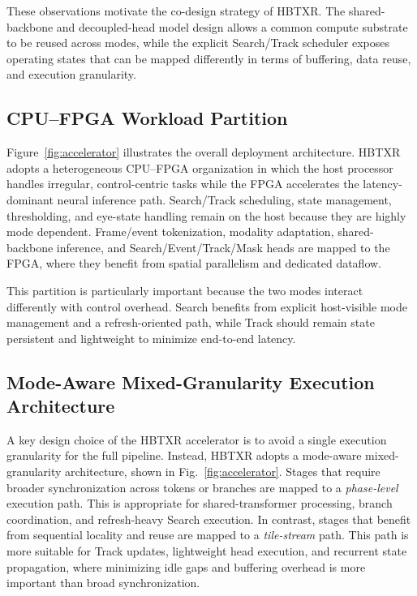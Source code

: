 \documentclass[journal]{IEEEtran}
\begin{document}
These observations motivate the co-design strategy of HBTXR. The shared-backbone and decoupled-head model design allows a common compute substrate to be reused across modes, while the explicit Search/Track scheduler exposes operating states that can be mapped differently in terms of buffering, data reuse, and execution granularity.

\subsection{CPU--FPGA Workload Partition}
Figure~\ref{fig:accelerator} illustrates the overall deployment architecture. HBTXR adopts a heterogeneous CPU--FPGA organization in which the host processor handles irregular, control-centric tasks while the FPGA accelerates the latency-dominant neural inference path. Search/Track scheduling, state management, thresholding, and eye-state handling remain on the host because they are highly mode dependent. Frame/event tokenization, modality adaptation, shared-backbone inference, and Search/Event/Track/Mask heads are mapped to the FPGA, where they benefit from spatial parallelism and dedicated dataflow.

This partition is particularly important because the two modes interact differently with control overhead. Search benefits from explicit host-visible mode management and a refresh-oriented path, while Track should remain state persistent and lightweight to minimize end-to-end latency.

\subsection{Mode-Aware Mixed-Granularity Execution Architecture}
A key design choice of the HBTXR accelerator is to avoid a single execution granularity for the full pipeline. Instead, HBTXR adopts a mode-aware mixed-granularity architecture, shown in Fig.~\ref{fig:accelerator}. Stages that require broader synchronization across tokens or branches are mapped to a \emph{phase-level} execution path. This is appropriate for shared-transformer processing, branch coordination, and refresh-heavy Search execution. In contrast, stages that benefit from sequential locality and reuse are mapped to a \emph{tile-stream} path. This path is more suitable for Track updates, lightweight head execution, and recurrent state propagation, where minimizing idle gaps and buffering overhead is more important than broad synchronization.
\end{document}
